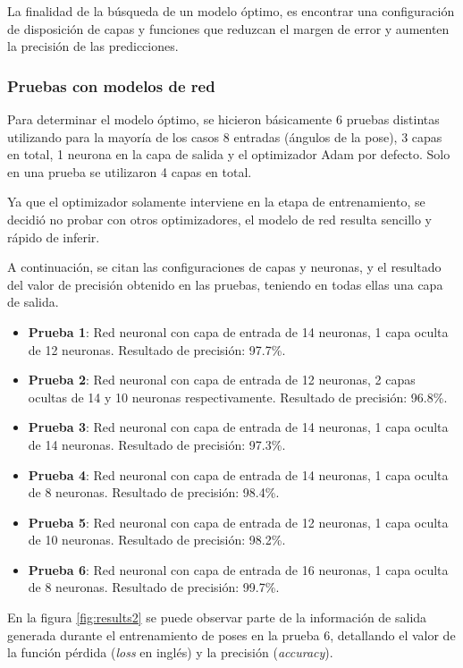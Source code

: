 \documentclass[a4paper,12pt,oneside,spanish]{book}
\begin{document}
La finalidad de la búsqueda de un modelo óptimo, es encontrar una configuración de disposición de capas y funciones que reduzcan el margen de error y aumenten la precisión de las predicciones.\par

\subsubsection{Pruebas con modelos de red}
Para determinar el modelo óptimo, se hicieron básicamente 6 pruebas distintas utilizando para la mayoría de los casos 8 entradas (ángulos de la pose), 3 capas en total, 1 neurona en la capa de salida y el optimizador Adam por defecto. Solo en una prueba se utilizaron 4 capas en total.\par

Ya que el optimizador solamente interviene en la etapa de entrenamiento, se decidió no probar con otros optimizadores, el modelo de red resulta sencillo y rápido de inferir.\par

A continuación, se citan las configuraciones de capas y neuronas, y el resultado del valor de precisión obtenido en las pruebas, teniendo en todas ellas una capa de salida.
\begin{itemize}
	\item \textbf{Prueba 1}: 
	Red neuronal con capa de entrada de 14 neuronas, 1 capa oculta de 12 neuronas. Resultado de precisión: 97.7\%.
	\item \textbf{Prueba 2}: 
	Red neuronal con capa de entrada de 12 neuronas, 2 capas ocultas de 14 y 10 neuronas respectivamente. Resultado de precisión: 96.8\%.	
	\item \textbf{Prueba 3}: 
	Red neuronal con capa de entrada de 14 neuronas, 1 capa oculta de 14 neuronas. Resultado de precisión: 97.3\%.	
	\item \textbf{Prueba 4}: 
	Red neuronal con capa de entrada de 14 neuronas, 1 capa oculta de 8 neuronas. Resultado de precisión: 98.4\%.	
	\item \textbf{Prueba 5}: 
	Red neuronal con capa de entrada de 12 neuronas, 1 capa oculta de 10 neuronas. Resultado de precisión: 98.2\%.	
	\item \textbf{Prueba 6}: 
	Red neuronal con capa de entrada de 16 neuronas, 1 capa oculta de 8 neuronas. Resultado de precisión: 99.7\%.	
\end{itemize}

En la figura \ref{fig:results2} se puede observar parte de la información de salida generada durante el entrenamiento de poses en la prueba 6, detallando  el valor de la función pérdida (\textit{loss} en inglés) y la precisión (\textit{accuracy}).
\end{document}
